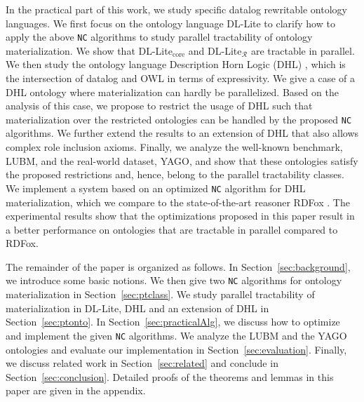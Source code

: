 In the practical part of this work, we study specific datalog rewritable ontology languages.
We first focus on the ontology language DL-Lite \cite{CalvaneseGLLR07} to clarify how to apply the above \texttt{NC} algorithms
to study parallel tractability of ontology materialization.
We show that DL-Lite$_{\text{core}}$ and DL-Lite$_\mathcal{R}$ are tractable in parallel.
We then study the ontology language Description Horn Logic (DHL) \cite{GrosofHVD03}, which is the intersection of datalog and OWL
in terms of expressivity. We give a case of a DHL ontology where materialization can hardly be parallelized.
Based on the analysis of this case, we propose to restrict the usage of DHL such that materialization over the
restricted ontologies can be handled by the proposed \texttt{NC} algorithms.
We further extend the results to an extension of DHL that also allows complex role inclusion axioms.
Finally, we analyze the well-known benchmark, LUBM, and the real-world dataset, YAGO, and
show that these ontologies satisfy the
proposed restrictions and, hence, belong to the parallel tractability classes.
We implement a system based on an optimized \texttt{NC} algorithm for DHL materialization,
which we compare to the state-of-the-art reasoner RDFox \cite{MotikNPHO14}.
The experimental results show that the optimizations proposed in this paper result in a
better performance on ontologies that are
tractable in parallel compared to RDFox.

The remainder of the paper is organized as follows. In Section~\ref{sec:background}, we introduce some basic notions.
We then give two \texttt{NC} algorithms for ontology materialization in Section~\ref{sec:ptclass}.
We study parallel tractability of materialization in DL-Lite, DHL and an extension of DHL in Section~\ref{sec:ptonto}.
In Section~\ref{sec:practicalAlg},
we discuss how to optimize and implement the given \texttt{NC} algorithms.
We analyze the LUBM and the YAGO ontologies and evaluate our implementation in Section~\ref{sec:evaluation}.
Finally, we discuss related work in Section~\ref{sec:related} and conclude in Section~\ref{sec:conclusion}. Detailed proofs of the theorems and lemmas in this paper are given in the appendix.



